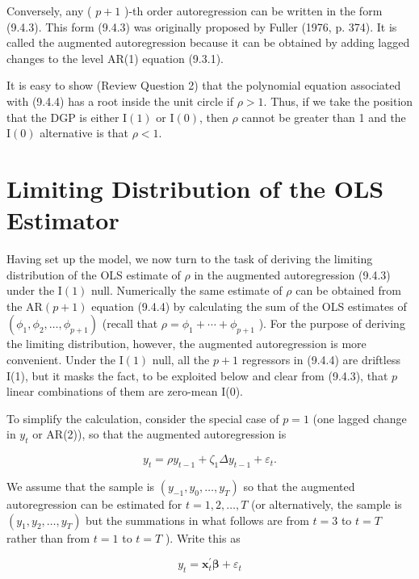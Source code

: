 \documentclass[10pt]{article}
\begin{document}
Conversely, any ( $p+1$ )-th order autoregression can be written in the form (9.4.3). This form (9.4.3) was originally proposed by Fuller (1976, p. 374). It is called the augmented autoregression because it can be obtained by adding lagged changes to the level AR(1) equation (9.3.1).

It is easy to show (Review Question 2) that the polynomial equation associated with (9.4.4) has a root inside the unit circle if $\rho>1$. Thus, if we take the position that the DGP is either $\mathrm{I}(1)$ or $\mathrm{I}(0)$, then $\rho$ cannot be greater than 1 and the $\mathrm{I}(0)$ alternative is that $\rho<1$.

\section*{Limiting Distribution of the OLS Estimator}
Having set up the model, we now turn to the task of deriving the limiting distribution of the OLS estimate of $\rho$ in the augmented autoregression (9.4.3) under the $\mathrm{I}(1)$ null. Numerically the same estimate of $\rho$ can be obtained from the $\mathrm{AR}(p+1)$ equation (9.4.4) by calculating the sum of the OLS estimates of $\left(\phi_{1}, \phi_{2}, \ldots, \phi_{p+1}\right)$ (recall that $\rho=\phi_{1}+\cdots+\phi_{p+1}$ ). For the purpose of deriving the limiting distribution, however, the augmented autoregression is more convenient. Under the $\mathrm{I}(1)$ null, all the $p+1$ regressors in (9.4.4) are driftless I(1), but it masks the fact, to be exploited below and clear from (9.4.3), that $p$ linear combinations of them are zero-mean I(0).

To simplify the calculation, consider the special case of $p=1$ (one lagged change in $y_{t}$ or AR(2)), so that the augmented autoregression is


\begin{equation*}
y_{t}=\rho y_{t-1}+\zeta_{1} \Delta y_{t-1}+\varepsilon_{t} . \tag{9.4.6}
\end{equation*}


We assume that the sample is $\left(y_{-1}, y_{0}, \ldots, y_{T}\right)$ so that the augmented autoregression can be estimated for $t=1,2, \ldots, T$ (or alternatively, the sample is $\left(y_{1}, y_{2}, \ldots, y_{T}\right)$ but the summations in what follows are from $t=3$ to $t=T$ rather than from $t=1$ to $t=T$ ). Write this as

$$
y_{t}=\mathbf{x}_{t}^{\prime} \boldsymbol{\beta}+\varepsilon_{t}
$$
\end{document}

